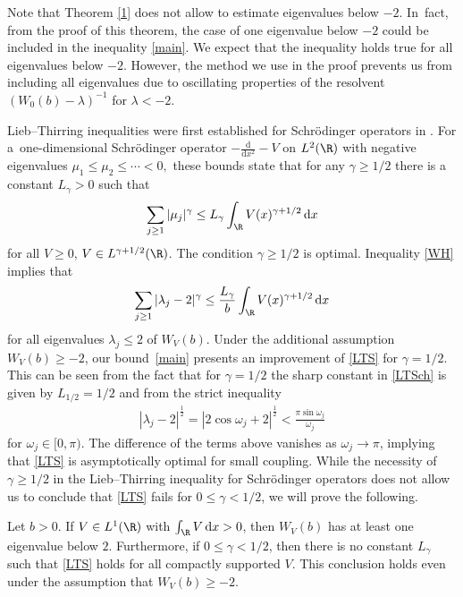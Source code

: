 \begin{Remark}
Note that Theorem \ref{1} does not allow to estimate eigenvalues below $-2$. In~fact, from the proof of this theorem, the case of one eigenvalue below $-2$ could be included in the inequality \eqref{main}. We expect that the inequality holds true for all eigenvalues below $-2$. However, the method we use in the proof prevents us from including all eigenvalues due to oscillating properties of the resolvent $(W_0(b) - \lambda)^{-1}$ for $\lambda<-2$.
\end{Remark}

Lieb--Thirring inequalities were first established for Schr\"odinger operators in \cite{LT}. For a~one-dimensional Schr\"odinger operator ${-}\frac{\mathrm{d}}{\mathrm{d}x^2}-V$ on $L^2(\R)$ with negative eigenvalues \mbox{$\mu_1\le\mu_2\allowbreak\le\!\cdots\!<0,\!$} these bounds state that for any $\gamma\ge1/2$ there is a constant $L_\gamma>0$ such that
\begin{gather}
\sum_{j\ge 1}|\mu_j|^{\gamma}\le L_{\gamma}\int_{\R}V(x)^{\gamma+1/2}\, {\rm d} x
\label{LTSch}
\end{gather}
for all $V\ge0$, $V\in L^{\gamma+1/2}(\R)$. The condition $\gamma\ge1/2$ is optimal. Inequality \eqref{WH} implies that
\begin{gather}
\sum_{j\ge 1}|\lambda_j-2|^{\gamma}\le \frac{L_{\gamma}}{b}\int_{\R}V(x)^{\gamma+1/2}\, {\rm d} x
\label{LTS}
\end{gather}
for all eigenvalues $\lambda_j\le 2$ of $W_V(b)$. Under the additional assumption $W_V(b)\ge-2$, our bound~\eqref{main} presents an improvement of \eqref{LTS} for $\gamma=1/2$. This can be seen from the fact that for $\gamma=1/2$ the sharp constant in \eqref{LTSch} is given by $L_{1/2}=1/2$ \cite{HLT} and from the strict inequality
\begin{gather*}
|\lambda_j-2|^\frac12=|2\cos\omega_j+2|^\frac12<\frac{\pi\sin\omega_j}{\omega_j}
\end{gather*}
for $\omega_j\in[0,\pi)$.
The difference of the terms above vanishes as $\omega_j\to\pi$, implying that \eqref{LTS} is asymptotically optimal for small coupling. While the necessity of $\gamma\ge1/2$ in the Lieb--Thirring inequality for Schr\"odinger operators does not allow us to conclude that \eqref{LTS} fails for $0\le\gamma<1/2$, we will prove the following.

\begin{Theorem}\label{th:res}
Let $b>0$. If $V\in L^1(\R)$ with $\int_{\R}V\, {\rm d} x>0$, then $W_V(b)$ has at least one eigenvalue below $2$. Furthermore, if $0\le\gamma<1/2$, then there is no constant $L_\gamma$ such that \eqref{LTS} holds for all compactly supported $V$. This conclusion holds even under the assumption that $W_V(b)\ge-2$.
\end{Theorem}

